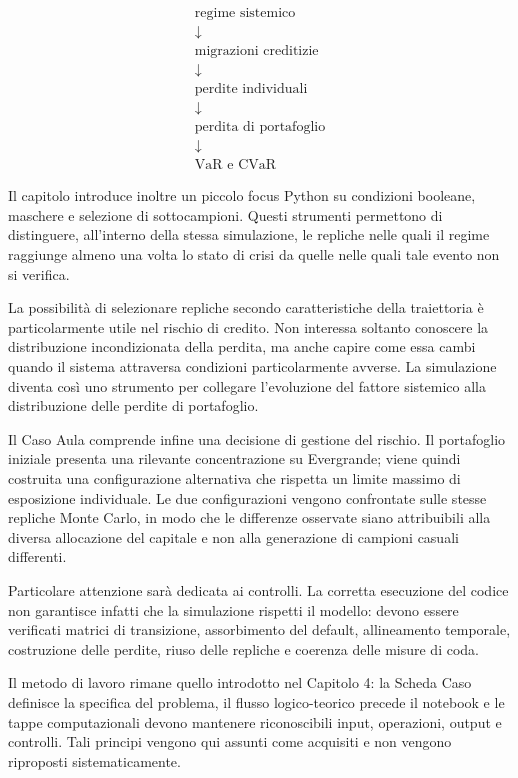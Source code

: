 \begin{gather*}
\text{regime sistemico}\\
\downarrow\\
\text{migrazioni creditizie}\\
\downarrow\\
\text{perdite individuali}\\
\downarrow\\
\text{perdita di portafoglio}\\
\downarrow\\
\text{VaR e CVaR}
\end{gather*}


Il capitolo introduce inoltre un piccolo focus Python su condizioni booleane,
maschere e selezione di sottocampioni. Questi strumenti permettono di
distinguere, all'interno della stessa simulazione, le repliche nelle quali il
regime raggiunge almeno una volta lo stato di crisi da quelle nelle quali tale
evento non si verifica.

La possibilit\`a di selezionare repliche secondo caratteristiche della
traiettoria \`e particolarmente utile nel rischio di credito. Non interessa
soltanto conoscere la distribuzione incondizionata della perdita, ma anche
capire come essa cambi quando il sistema attraversa condizioni
particolarmente avverse. La simulazione diventa cos\`i uno strumento per
collegare l'evoluzione del fattore sistemico alla distribuzione delle perdite
di portafoglio.

Il Caso Aula comprende infine una decisione di gestione del rischio. Il
portafoglio iniziale presenta una rilevante concentrazione su Evergrande;
viene quindi costruita una configurazione alternativa che rispetta un limite
massimo di esposizione individuale. Le due configurazioni vengono confrontate
sulle stesse repliche Monte Carlo, in modo che le differenze osservate siano
attribuibili alla diversa allocazione del capitale e non alla generazione di
campioni casuali differenti.

Particolare attenzione sar\`a dedicata ai controlli. La corretta esecuzione
del codice non garantisce infatti che la simulazione rispetti il modello:
devono essere verificati matrici di transizione, assorbimento del default,
allineamento temporale, costruzione delle perdite, riuso delle repliche e
coerenza delle misure di coda.

Il metodo di lavoro rimane quello introdotto nel Capitolo 4: la Scheda Caso
definisce la specifica del problema, il flusso logico-teorico precede il
notebook e le tappe computazionali devono mantenere riconoscibili input,
operazioni, output e controlli. Tali principi vengono qui assunti come
acquisiti e non vengono riproposti sistematicamente.

